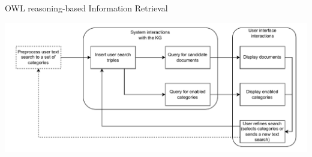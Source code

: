 







\begin{frame}[noframenumbering]{OWL reasoning-based Information Retrieval}

        \begin{center}
            \includegraphics[scale=0.6]{images/ir-onto-search-process.pdf} 
        \end{center}

\end{frame}

